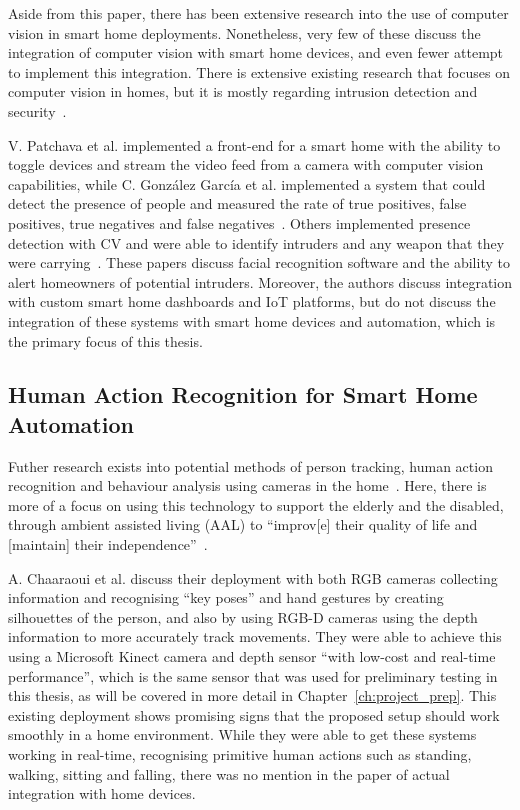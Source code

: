 Aside from this paper, there has been extensive research into the use of computer vision in smart home deployments.
Nonetheless, very few of these discuss the integration of computer vision with smart home devices, and even fewer attempt to implement this integration.
There is extensive existing research that focuses on computer vision in homes, but it is mostly regarding intrusion detection and security~\cite{Cucc05,Garc17,Nand20,Patc15,Sefa14,Zhan19}.

V. Patchava et al. implemented a front-end for a smart home with the ability to toggle devices and stream the video feed from a camera with computer vision capabilities, while C. González García et al. implemented a system that could detect the presence of people and measured the rate of true positives, false positives, true negatives and false negatives~\cite{Patc15,Garc17}.
Others implemented presence detection with CV and were able to identify intruders and any weapon that they were carrying~\cite{Cucc05,Nand20}.
These papers discuss facial recognition software and the ability to alert homeowners of potential intruders.
Moreover, the authors discuss integration with custom smart home dashboards and IoT platforms, but do not discuss the integration of these systems with smart home devices and automation, which is the primary focus of this thesis.

\subsection{Human Action Recognition for Smart Home Automation}
Futher research exists into potential methods of person tracking, human action recognition and behaviour analysis using cameras in the home~\cite{Chaa13}.
Here, there is more of a focus on using this technology to support the elderly and the disabled, through ambient assisted living (AAL) to ``improv[e] their quality of life and [maintain] their independence''~\cite{Chaa13}.

A. Chaaraoui et al. discuss their deployment with both RGB cameras collecting information and recognising ``key poses'' and hand gestures by creating silhouettes of the person, and also by using RGB-D cameras using the depth information to more accurately track movements.
They were able to achieve this using a Microsoft Kinect camera and depth sensor ``with low-cost and real-time performance'', which is the same sensor that was used for preliminary testing in this thesis, as will be covered in more detail in Chapter~\ref{ch:project_prep}.
This existing deployment shows promising signs that the proposed setup should work smoothly in a home environment.
While they were able to get these systems working in real-time, recognising primitive human actions such as standing, walking, sitting and falling, there was no mention in the paper of actual integration with home devices.

